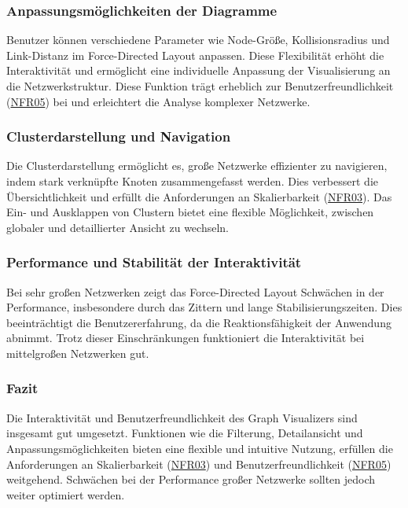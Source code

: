 \subsubsection{Anpassungsmöglichkeiten der Diagramme}

Benutzer können verschiedene Parameter wie Node-Größe, Kollisionsradius und Link-Distanz im Force-Directed Layout anpassen. Diese Flexibilität erhöht die Interaktivität und ermöglicht eine individuelle Anpassung der Visualisierung an die Netzwerkstruktur. Diese Funktion trägt erheblich zur Benutzerfreundlichkeit (\hyperref[NFR05]{NFR05}) bei und erleichtert die Analyse komplexer Netzwerke.

\subsubsection{Clusterdarstellung und Navigation}

Die Clusterdarstellung ermöglicht es, große Netzwerke effizienter zu navigieren, indem stark verknüpfte Knoten zusammengefasst werden. Dies verbessert die Übersichtlichkeit und erfüllt die Anforderungen an Skalierbarkeit (\hyperref[NFR03]{NFR03}). Das Ein- und Ausklappen von Clustern bietet eine flexible Möglichkeit, zwischen globaler und detaillierter Ansicht zu wechseln.

\subsubsection{Performance und Stabilität der Interaktivität}

Bei sehr großen Netzwerken zeigt das Force-Directed Layout Schwächen in der Performance, insbesondere durch das Zittern und lange Stabilisierungszeiten. Dies beeinträchtigt die Benutzererfahrung, da die Reaktionsfähigkeit der Anwendung abnimmt. Trotz dieser Einschränkungen funktioniert die Interaktivität bei mittelgroßen Netzwerken gut.

\subsubsection{Fazit}

Die Interaktivität und Benutzerfreundlichkeit des Graph Visualizers sind insgesamt gut umgesetzt. Funktionen wie die Filterung, Detailansicht und Anpassungsmöglichkeiten bieten eine flexible und intuitive Nutzung, erfüllen die Anforderungen an Skalierbarkeit (\hyperref[NFR03]{NFR03}) und Benutzerfreundlichkeit (\hyperref[NFR05]{NFR05}) weitgehend. Schwächen bei der Performance großer Netzwerke sollten jedoch weiter optimiert werden.